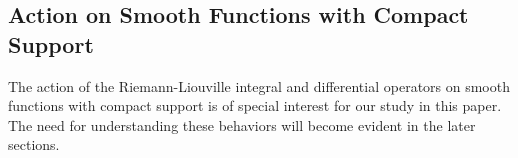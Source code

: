 \documentclass[leqno,final]{siamltex}
\numberwithin{equation}{section}
\newcommand{\Ome}{{\Omega}}
\renewcommand{\(}{\bigl(}
\renewcommand{\)}{\bigr)}
\newcommand{\R}{\mathbb{R}}
\begin{document}
    \subsection{Action on Smooth Functions with Compact Support}\label{sec-2.7}
        The action of the Riemann-Liouville integral and differential operators 
        on smooth functions with compact support is of special interest for our study 
        in this paper. The need for understanding these behaviors will become evident 
        in the later sections. 
        
        
        
            
\end{document}

